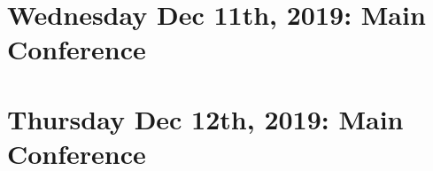 \documentclass[11pt]{article}
\begin{document}
\newpage
\section{Wednesday Dec 11th, 2019: Main Conference}


\newpage
\section{Thursday Dec 12th, 2019: Main Conference}




\newpage


\end{document}

